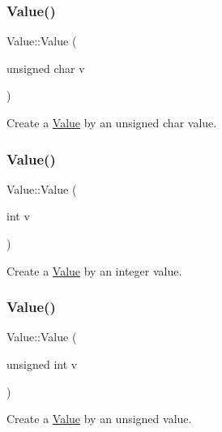 \subsubsection{\texorpdfstring{Value()}{Value()}\hspace{0.1cm}{\footnotesize\ttfamily [19/34]}}
{\footnotesize\ttfamily Value\+::\+Value (\begin{DoxyParamCaption}\item[{unsigned char}]{v }\end{DoxyParamCaption})\hspace{0.3cm}{\ttfamily [explicit]}}

Create a \hyperlink{classValue}{Value} by an unsigned char value. \mbox{\label{classValue_ad66a1aec17bd011f542d70e8dcf85739}} 
\subsubsection{\texorpdfstring{Value()}{Value()}\hspace{0.1cm}{\footnotesize\ttfamily [20/34]}}
{\footnotesize\ttfamily Value\+::\+Value (\begin{DoxyParamCaption}\item[{int}]{v }\end{DoxyParamCaption})\hspace{0.3cm}{\ttfamily [explicit]}}

Create a \hyperlink{classValue}{Value} by an integer value. \mbox{\label{classValue_aca420574da40e0503bbb5b3c124a19b4}} 
\subsubsection{\texorpdfstring{Value()}{Value()}\hspace{0.1cm}{\footnotesize\ttfamily [21/34]}}
{\footnotesize\ttfamily Value\+::\+Value (\begin{DoxyParamCaption}\item[{unsigned int}]{v }\end{DoxyParamCaption})\hspace{0.3cm}{\ttfamily [explicit]}}

Create a \hyperlink{classValue}{Value} by an unsigned value. \mbox{\label{classValue_a522f9e03113fc05bab847df24c68c648}} 
